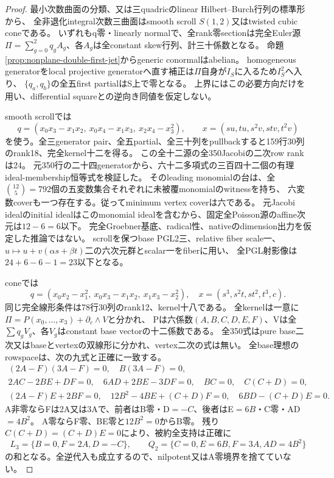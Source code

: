 \documentclass[a4paper,11pt]{ltjsarticle}
\theoremstyle{definition}
\begin{document}
\begin{proof}
最小次数曲面の分類、又は三quadricのlinear Hilbert--Burch行列の標準形から、
全非退化integral次数三曲面はsmooth scroll $S(1,2)$又はtwisted cubic coneである。
いずれもq零・linearly normalで、全rank零sectionは完全Euler源
$\Pi=\sum_{g=0}^2q_gA_g$、各$A_g$は全constant skew行列、計三十係数となる。
命題\ref{prop:nonplane-double-first-jet}からgeneric conormalはabelian。
homogeneous generatorをlocal projective generatorへ直す補正は$\Pi$自身が$I_S$に入るため$I_S^2$へ入り、
$\{q_a,q_b\}$の全五first partialはS上で零となる。
上界にはこの必要方向だけを用い、differential squareとの逆向き同値を仮定しない。

smooth scrollでは
\[
 q=(x_0x_3-x_1x_2,\ x_0x_4-x_1x_3,\ x_2x_4-x_3^2),\qquad
 x=(su,tu,s^2v,stv,t^2v)
\]
を使う。全三generator pair、全五partial、全三十列をpullbackすると159行30列のrank18、完全kernel十二を得る。
この全十二源の全350Jacobiの二次row rankは24。
元350行の二十四generatorから、六十二多項式の三百四十二個の有理ideal-membership恒等式を検証した。
そのleading monomialの台は、全$\binom{12}{5}=792$個の五変数集合それぞれに未被覆monomialのwitnessを持ち、
六変数coverも一つ存在する。従ってminimum vertex coverは六である。
元Jacobi idealのinitial idealはこのmonomial idealを含むから、固定全Poisson源のaffine次元は$12-6=6$以下。
完全Groebner基底、radical性、nativeのdimension出力を仮定した推論ではない。
scrollを保つbase PGL2三、relative fiber scale一、$u\mapsto u+v(\alpha s+\beta t)$二の六次元群とscalar一をfiberに用い、
全PGL射影像は$24+6-6-1=23$以下となる。

coneでは
\[
 q=(x_0x_2-x_1^2,\ x_0x_3-x_1x_2,\ x_1x_3-x_2^2),\quad
 x=(s^3,s^2t,st^2,t^3,c).
\]
同じ完全線形条件は78行30列のrank12、kernel十八である。
全kernelは一意に$\Pi=P(x_0,\ldots,x_3)+\partial_c\wedge V$と分かれ、
Pは六係数$(A,B,C,D,E,F)$、Vは全$\sum q_gV_g$、各$V_g$はconstant base vectorの十二係数である。
全350式はpure base二次又はbaseとvertexの双線形に分かれ、vertex二次の式は無い。
全base理想のrowspaceは、次の九式と正確に一致する。
\[
\begin{gathered}
 (2A-F)(3A-F)=0,\quad B(3A-F)=0,\\
 2AC-2BE+DF=0,\quad6AD+2BE-3DF=0,\quad BC=0,\quad C(C+D)=0,\\
 (2A-F)E+2BF=0,\quad12B^2-4BE+(C+D)F=0,\quad6BD-(C+D)E=0.
\end{gathered}
\]
A非零ならFは2A又は3Aで、前者はB零・D$=-C$、後者はE$=6B$・C零・AD$=4B^2$。
A零ならF零、BE零と$12B^2=0$からB零。
残り$C(C+D)=(C+D)E=0$により、被約全支持は正確に
\[
 L_3=\{B=0,F=2A,D=-C\},\qquad
 Q_2=\{C=0,E=6B,F=3A,AD=4B^2\}
\]
の和となる。全逆代入も成立するので、nilpotent又はA零境界を捨てていない。


\end{proof}
\end{document}
